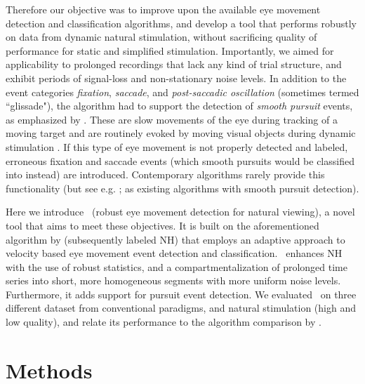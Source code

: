 Therefore our objective was to improve upon the available eye movement
detection and classification algorithms, and develop a tool that performs
robustly on data from dynamic natural stimulation, without sacrificing quality
of performance for static and simplified stimulation. Importantly, we aimed for
applicability to prolonged recordings that lack any kind of trial structure,
and exhibit periods of signal-loss and non-stationary noise levels.
In addition to the event categories \textit{fixation}, \textit{saccade}, and
\textit{post-saccadic oscillation} (sometimes termed ``glissade"), the
algorithm had to support the detection of \textit{smooth pursuit} events, as
emphasized by \cite{Friedman2018}.  These are slow movements of the eye during
tracking of a moving target and are routinely evoked by moving visual objects
during dynamic stimulation \citep{carl1987pursuits}.  If this type of eye
movement is not properly detected and labeled, erroneous fixation and saccade
events (which smooth pursuits would be classified into instead) are introduced.
Contemporary algorithms rarely provide this functionality (but see e.g.
\cite{LARSSON2015145}; \cite{Komogortsev2013} as existing algorithms with
smooth pursuit detection).

Here we introduce \remodnav\ (robust eye movement detection for natural
viewing), a novel tool that aims to meet these objectives. It is built on the
aforementioned algorithm by \citet{Nystrom2010AnData} (subsequently labeled NH)
that employs an adaptive approach to velocity based eye movement event
detection and classification. \remodnav\ enhances NH with the use of robust
statistics, and a compartmentalization of prolonged time series into short,
more homogeneous segments with more uniform noise levels. Furthermore, it adds
support for pursuit event detection. We evaluated \remodnav\ on three different
dataset from conventional paradigms, and natural stimulation (high and low
quality), and relate its performance to the algorithm comparison by
\cite{Andersson2017}.


\section*{Methods}\label{methods}



